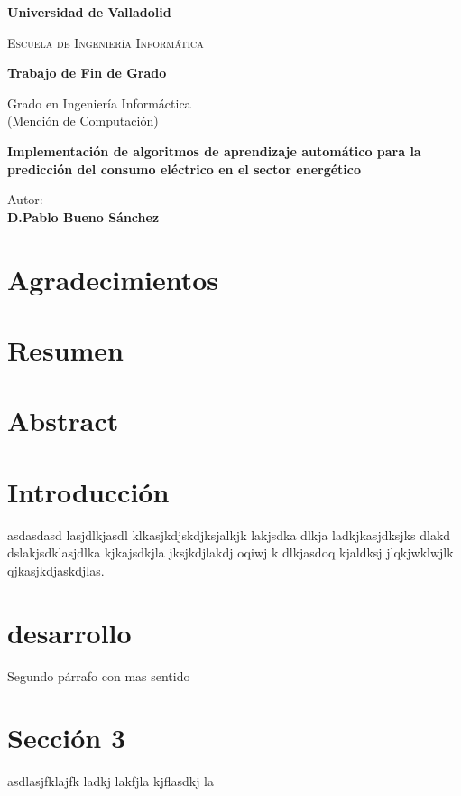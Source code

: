 \documentclass[a4paper,12pt]{article}
\begin{document}
\begin{titlepage}
    \centering
    {\bfseries\Large Universidad de Valladolid \par}
    \vspace{2cm}
    {\scshape\Huge Escuela de Ingeniería Informática \par}
    {\bfseries\Large Trabajo de Fin de Grado \par}
    \vspace{2cm}
    {\Large Grado en Ingeniería Informáctica 
    \\ (Mención de Computación) \par}
    \vspace{2.5cm}
    {\bfseries\Huge Implementación de algoritmos de aprendizaje automático para la
    predicción del consumo eléctrico en el sector energético \par}
    \vspace{2cm}
    \raggedleft
    {Autor: \\
    \bfseries D.Pablo Bueno Sánchez}
\end{titlepage}

\tableofcontents

\newpage

\section*{Agradecimientos}

\newpage

\section*{Resumen}

\newpage

\section*{Abstract}

\section{Introducción}

asdasdasd lasjdlkjasdl klkasjkdjskdjksjalkjk lakjsdka dlkja ladkjkasjdksjks dlakd
dslakjsdklasjdlka kjkajsdkjla jksjkdjlakdj oqiwj k dlkjasdoq kjaldksj 
jlqkjwklwjlk 
qjkasjkdjaskdjlas.

\newpage

\section{desarrollo}

Segundo párrafo con mas sentido

\newpage

\section{Sección 3}

asdlasjfklajfk ladkj lakfjla kjflasdkj la
\end{document}
